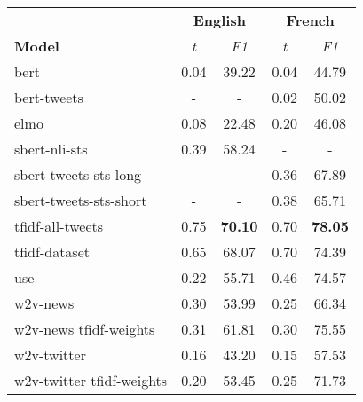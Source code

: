 \begin{tabular}{|l|cc|cc|}
\hline
\rowcolor{gray!25}                           &\multicolumn{2}{c}{\textbf{English}}&\multicolumn{2}{|c|}{\textbf{French}}\\
\cline{2-5}
                   \textbf{Model}  & \textit{t} & \textit{F1} & \textit{t} & \textit{F1} \\
\hline
                     bert  &       0.04 &       39.22 &       0.04 &       44.79 \\
              bert-tweets  &          - &           - &       0.02 &       50.02 \\
                     elmo  &       0.08 &       22.48 &       0.20 &       46.08 \\
            sbert-nli-sts  &       0.39 &       58.24 &          - &           - \\
    sbert-tweets-sts-long  &          - &           - &       0.36 &       67.89 \\
   sbert-tweets-sts-short  &          - &           - &       0.38 &       65.71 \\
         tfidf-all-tweets  &       0.75 &\textbf{70.10}&      0.70 &\textbf{78.05}\\
            tfidf-dataset  &       0.65 &       68.07 &       0.70 &       74.39 \\
                      use  &       0.22 &       55.71 &       0.46 &       74.57 \\
                 w2v-news  &       0.30 &       53.99 &       0.25 &       66.34 \\
    w2v-news tfidf-weights &       0.31 &       61.81 &       0.30 &       75.55 \\
              w2v-twitter  &       0.16 &       43.20 &       0.15 &       57.53 \\
 w2v-twitter tfidf-weights &       0.20 &       53.45 &       0.25 &       71.73 \\
\hline
\end{tabular}
